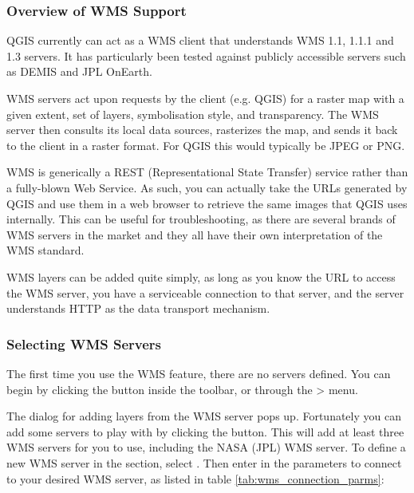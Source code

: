 \subsubsection{Overview of WMS Support}\label{sec:ogc-wms-about}

QGIS currently can act as a WMS client that understands WMS 1.1, 1.1.1 and 1.3
servers.  It has particularly been tested against publicly accessible servers
such as DEMIS and JPL OnEarth.

WMS servers act upon requests by the client (e.g. QGIS) for a raster map with
a given extent, set of layers, symbolisation style, and transparency.  The WMS
server then consults its local data sources, rasterizes the map, and sends
it back to the client in a raster format.  For QGIS this would typically
be JPEG or PNG.

WMS is generically a REST (Representational State Transfer) service rather than
a fully-blown Web Service.  As such, you can actually take the URLs generated by
QGIS and use them in a web browser to retrieve the same images that QGIS uses
internally.  This can be useful for troubleshooting, as there are
several brands of WMS servers in the market and they all have their own
interpretation of the WMS standard.

WMS layers can be added quite simply, as long as you know the URL to access
the WMS server, you have a serviceable connection to that server, and the
server understands HTTP as the data transport mechanism.

\subsubsection{Selecting WMS Servers}\label{sec:ogc-wms-servers}

The first time you use the WMS feature, there are no servers defined. You 
can begin by clicking the  button inside the toolbar, 
or through the > menu.

The dialog  for adding layers from the WMS server pops up. Fortunately you can 
add some servers to play with by clicking the  
button. This will add at least three WMS servers for you to use, including the NASA (JPL) 
WMS server. To define a new WMS server in the  section, 
select . Then enter in the parameters to connect to your desired
WMS server, as listed in table \ref{tab:wms_connection_parms}:

